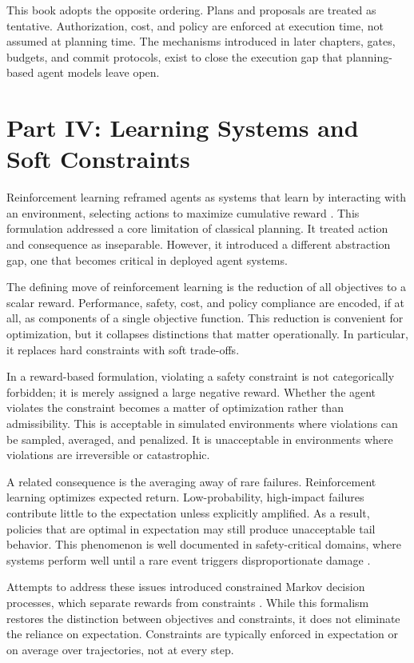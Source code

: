 This book adopts the opposite ordering. Plans and proposals are treated as
tentative. Authorization, cost, and policy are enforced at execution time, not
assumed at planning time. The mechanisms introduced in later chapters, gates,
budgets, and commit protocols, exist to close the execution gap that planning-based
agent models leave open.

\section{Part IV: Learning Systems and Soft Constraints}

Reinforcement learning reframed agents as systems that learn by interacting with an
environment, selecting actions to maximize cumulative reward
\cite{sutton2018reinforcement}. This formulation addressed a core limitation of
classical planning. It treated action and consequence as inseparable. However, it
introduced a different abstraction gap, one that becomes critical in deployed
agent systems.

The defining move of reinforcement learning is the reduction of all objectives to
a scalar reward. Performance, safety, cost, and policy compliance are encoded, if
at all, as components of a single objective function. This reduction is convenient
for optimization, but it collapses distinctions that matter operationally. In
particular, it replaces hard constraints with soft trade-offs.

In a reward-based formulation, violating a safety constraint is not categorically
forbidden; it is merely assigned a large negative reward. Whether the agent
violates the constraint becomes a matter of optimization rather than admissibility.
This is acceptable in simulated environments where violations can be sampled,
averaged, and penalized. It is unacceptable in environments where violations are
irreversible or catastrophic.

A related consequence is the averaging away of rare failures. Reinforcement
learning optimizes expected return. Low-probability, high-impact failures
contribute little to the expectation unless explicitly amplified. As a result,
policies that are optimal in expectation may still produce unacceptable tail
behavior. This phenomenon is well documented in safety-critical domains, where
systems perform well until a rare event triggers disproportionate damage
\cite{amodei2016concrete}.

Attempts to address these issues introduced constrained Markov decision processes,
which separate rewards from constraints \cite{altman1999constrained}. While this
formalism restores the distinction between objectives and constraints, it does not
eliminate the reliance on expectation. Constraints are typically enforced in
expectation or on average over trajectories, not at every step.

